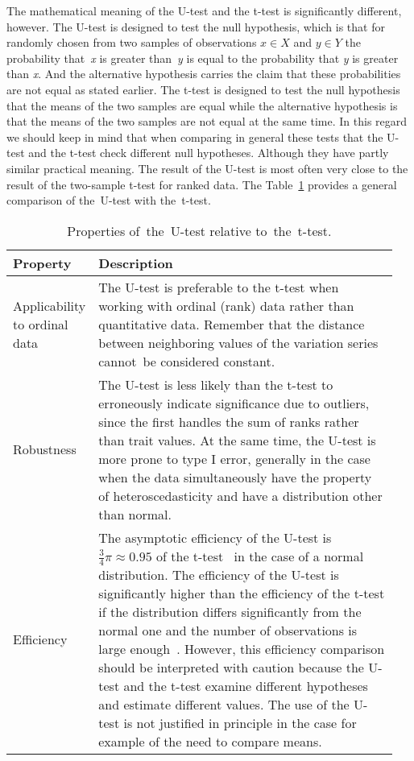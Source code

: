 \documentclass[]{scrreprt}
\begin{document}
The mathematical meaning of the U-test and the t-test is significantly different, however. The U-test is designed to test the null hypothesis, which is that for randomly chosen from two samples of observations $x \in X$ and $y \in Y$ the probability that~\textit{x} is greater than~\textit{y} is equal to the probability that \textit{y} is greater than \textit{x}. And the alternative hypothesis carries the claim that these probabilities are not equal as stated earlier. The t-test is designed to test the null hypothesis that the means of the two samples are equal while the alternative hypothesis is that the means of the two samples are not equal at the same time. In this regard we should keep in mind that when comparing in general these tests that the U-test and the t-test check different null hypotheses. Although they have partly similar practical meaning. The result of the U-test is most often very close to the result of the two-sample t-test for ranked data. The Table~\ref{tab:U-test-t-test-comparison} provides a general comparison of the~U-test with the~t-test.
%
\begin{table}[htp]
	\caption{Properties of~the~U-test relative to~the~t-test.}  \label{tab:U-test-t-test-comparison}
	\centering
	\begin{tabularx}{\textwidth}{p{0.15\linewidth} p{0.8\linewidth}} 
		\hline
		Property&Description\\
		\hline
		Applicability to ordinal data&The U-test is preferable to the t-test when working with ordinal (rank) data rather than quantitative data. Remember that the distance between neighboring values of the variation series cannot~be considered constant.\\
		\hline
		Robustness&The U-test is less likely than the t-test to erroneously indicate significance due to outliers, since the first handles the sum of ranks rather than trait values. At the same time, the U-test is more prone to type I error, generally in the case when the data simultaneously have the property of heteroscedasticity and have a distribution other than normal.\\
		\hline
		Efficiency&The asymptotic efficiency of the U-test is~$\frac{3}{4}\pi \approx 0.95$ of the t-test~\cite{U-test-efficiency} in the case of a normal distribution. The efficiency of the U-test is significantly higher than the efficiency of the t-test if the distribution differs significantly from the normal one and the number of observations is large enough~\cite{Practical-Nonparametric-Statistics}. However, this efficiency comparison should be interpreted with caution because the U-test and the t-test examine different hypotheses and estimate different values. The use of the U-test is not justified in principle in the case for example of the need to compare means.\\
		\hline
	\end{tabularx}
\end{table}
%
\end{document}
